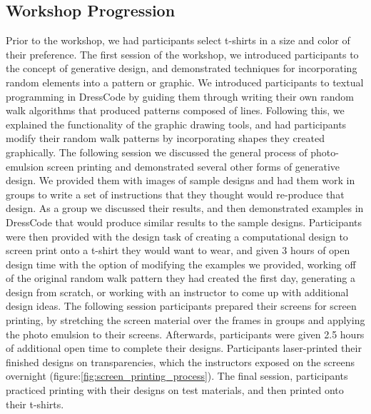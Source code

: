 \documentclass{sigchi}
\begin{document}
\subsection{Workshop Progression}
Prior to the workshop, we had participants select t-shirts in a size and color of their preference. The first session of the workshop, we introduced participants to the concept of generative design, and demonstrated techniques for incorporating random elements into a pattern or graphic. We introduced participants to textual programming in DressCode by guiding them through writing their own random walk algorithms that produced patterns composed of lines. Following this, we explained the functionality of the graphic drawing tools, and had participants modify their random walk patterns by incorporating shapes they created graphically. The following session we discussed the general process of photo-emulsion screen printing and demonstrated several other forms of generative design. We provided them with images of sample designs and had them work in groups to write a set of instructions that they thought would re-produce that design. As a group we discussed their results, and then demonstrated examples in DressCode that would produce similar results to the sample designs. %
Participants were then provided with the design task of creating a computational design to screen print onto a t-shirt they would want to wear, and given 3 hours of open design time with the option of modifying the examples we provided, working off of the original random walk pattern they had created the first day, generating a design from scratch, or working with an instructor to come up with additional design ideas. The following session participants prepared their screens for screen printing, by stretching the screen material over the frames in groups and applying the photo emulsion to their screens. Afterwards, participants were given 2.5 hours of additional open time to complete their designs. Participants laser-printed their finished designs on transparencies, which the instructors exposed on the screens overnight (figure:\ref{fig:screen_printing_process}). The final session, participants practiced printing with their designs on test materials, and then printed onto their t-shirts.
\end{document}
